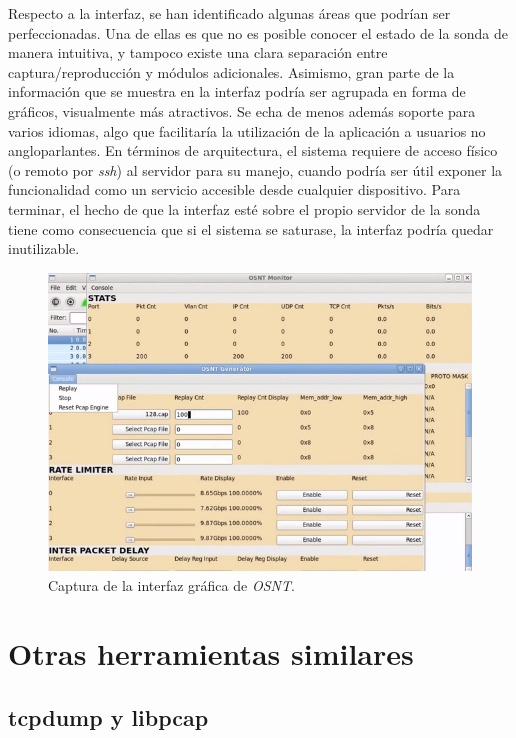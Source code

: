 Respecto a la interfaz, se han identificado algunas áreas que podrían ser perfeccionadas.
Una de ellas es que no es posible conocer el estado de la sonda de manera intuitiva, y tampoco existe una clara separación entre captura/reproducción y módulos adicionales.
Asimismo, gran parte de la información que se muestra en la interfaz podría ser agrupada en forma de gráficos, visualmente más atractivos.
Se echa de menos además soporte para varios idiomas, algo que facilitaría la utilización de la aplicación a usuarios no angloparlantes.
En términos de arquitectura, el sistema requiere de acceso físico (o remoto por \textit{ssh}) al servidor para su manejo, cuando podría ser útil exponer la funcionalidad como un servicio accesible desde cualquier dispositivo.
Para terminar, el hecho de que la interfaz esté sobre el propio servidor de la sonda tiene como consecuencia que si el sistema se saturase, la interfaz podría quedar inutilizable.

\begin{figure}[H]
  \centering
  \includegraphics[width=\textwidth,clip=true]{graphics/capturas/osnt}
  \caption{Captura de la interfaz gráfica de \textit{OSNT}.}
  \label{fig:osnt}
\end{figure}

\section{Otras herramientas similares\label{sec:eda:otras}}

\subsection*{tcpdump y libpcap\label{sec:eda:tcpdump}}

